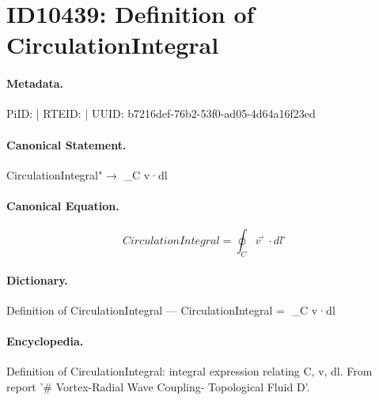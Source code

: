 \section*{ID10439: Definition of CirculationIntegral}
\paragraph{Metadata.}
PiID:  | RTEID:  | UUID: b7216def-76b2-53f0-ad05-4d64a16f23ed

\paragraph{Canonical Statement.}
CirculationIntegral" → ∮\_C v⃗·dl⃗

\paragraph{Canonical Equation.}
\[
CirculationIntegral = ∮_C v⃗·dl⃗
\]

\paragraph{Dictionary.}
Definition of CirculationIntegral — CirculationIntegral = ∮\_C v⃗·dl⃗

\paragraph{Encyclopedia.}
Definition of CirculationIntegral: integral expression relating C, v, dl. From report '\# Vortex-Radial Wave Coupling- Topological Fluid D'.
